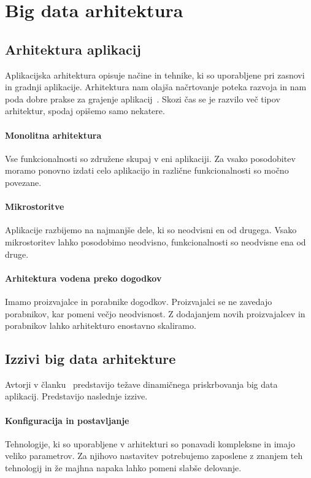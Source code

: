 \section{Big data arhitektura}

\subsection{Arhitektura aplikacij}
Aplikacijska arhitektura opisuje načine in tehnike, ki so uporabljene pri zasnovi in gradnji aplikacije.
Arhitektura nam olajša načrtovanje poteka razvoja in nam poda dobre prakse za grajenje aplikacij~\cite{application_architecture_def}.
Skozi čas se je razvilo več tipov arhitektur, spodaj opišemo samo nekatere.

\paragraph{Monolitna arhitektura}
Vse funkcionalnosti so združene skupaj v eni aplikaciji.
Za vsako posodobitev moramo ponovno izdati celo aplikacijo in različne funkcionalnosti so močno povezane.

\paragraph{Mikrostoritve}
Aplikacije razbijemo na najmanjše dele, ki so neodvisni en od drugega.
Vsako mikrostoritev lahko posodobimo neodvisno, funkcionalnosti so neodvisne ena od druge.

\paragraph{Arhitektura vodena preko dogodkov}
Imamo proizvajalce in porabnike dogodkov.
Proizvajalci se ne zavedajo porabnikov, kar pomeni večjo neodvisnost.
Z dodajanjem novih proizvajalcev in porabnikov lahko arhitekturo enostavno skaliramo.

\subsection{Izzivi big data arhitekture}
Avtorji v članku~\cite{provisioning_big_data_micro_cloud} predstavijo težave dinamičnega priskrbovanja big data aplikacij.
Predstavijo naslednje izzive.

\paragraph{Konfiguracija in postavljanje}
Tehnologije, ki so uporabljene v arhitekturi so ponavadi kompleksne in imajo veliko parametrov.
Za njihovo nastavitev potrebujemo zaposlene z znanjem teh tehnologij in že majhna napaka lahko pomeni slabše
delovanje.

